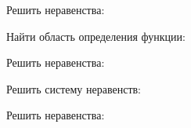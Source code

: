 \begin{enumcols}[label=\arabf]
	\item Решить неравенства:
	\begin{enumcols}[columns=2]
		\item {}
		\item {}
		\item {}
		\item {}
	\end{enumcols}
	\item Найти область определения функции:
	\begin{enumcols}[columns=2]
		\item {}
		\item {}
		\item {}
	\end{enumcols}
	\item Решить неравенства:
	\begin{enumcols}[columns=3]
		\item {}
		\item {}
		\item {}
		\item {}
		\item {}
	\end{enumcols}
	\item Решить систему неравенств:
	\begin{enumcols}[columns=2]
		\item {}
		\item {}
		\item {}
		\item {}
	\end{enumcols}
	\item Решить неравенства:
	\begin{enumcols}[columns=2]
		\item {}
		\item {}
		\item {}
		\item {}
	\end{enumcols}
\end{enumcols}